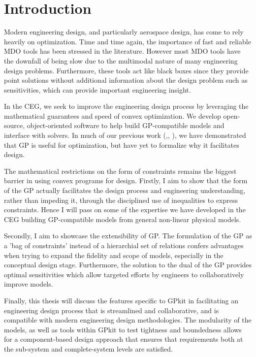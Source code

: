 \chapter{Introduction}

Modern engineering design, and particularly aerospace design, has come to rely
heavily on optimization. Time and time again, the importance of fast and
reliable MDO tools has been stressed in the literature. However most MDO tools
have the downfall of being slow due to the multimodal nature of many
engineering design problems. Furthermore, these tools act like black boxes since
they provide point solutions without additional information about the design problem
such as sensitivities, which can provide important engineering insight.
	
In the \gls{CEG}, we seek to improve the engineering design process by
leveraging the mathematical guarantees and speed of convex optimization. We develop
open-source, object-oriented software to help build \gls{GP}-compatible models and
interface with solvers. In much of our previous work
(\cite{gp_ac_design},\cite{SP_ac_design}, \cite{sp_engine}), we have demonstrated that
\gls{GP} is useful for optimization, but have yet to formalize why it
facilitates design.
 
The mathematical restrictions on the form of constraints remains the biggest
barrier in using convex programs for design. Firstly, I
aim to show that the form of the GP actually facilitates the design process
and engineering understanding, rather than impeding it, through the disciplined use
of inequalities to express constraints. Hence I will
pass on some of the expertise we have developed in the \gls{CEG} building
\gls{GP}-compatible models from general non-linear physical models. 

Secondly, I aim to showcase the extensibility of \gls{GP}.
The formulation of the \gls{GP} as a 'bag of
constraints' instead of a hierarchial set of relations confers advantages 
when trying to expand the fidelity and scope of models, especially in the 
conceptual design stage. Furthermore, the solution to the dual of the \gls{GP}
provides optimal sensitivities which allow targeted efforts by engineers to
collaboratively improve models.

Finally, this thesis will discuss the features specific to GPkit in facilitating
an engineering design process that is streamlined and collaborative, and is
compatible with modern engineering design methodologies. The modularity of the 
models, as well as tools within GPkit to test tightness and boundedness
allows for a component-based design approach that ensures that
requirements both at the sub-system and complete-system levels are satisfied. 


